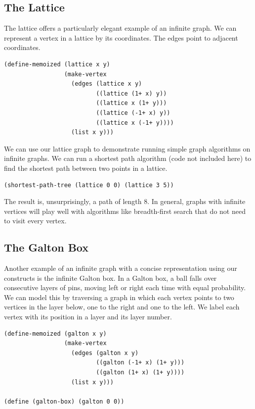 \documentclass[11pt]{article} %
\theoremstyle{component}
\begin{document}
\subsection{The Lattice}

The lattice offers a particularly elegant example of an infinite graph.  We can represent a vertex in a lattice by its coordinates.  The edges point to adjacent coordinates.

\begin{verbatim}
(define-memoized (lattice x y)
                 (make-vertex
                   (edges (lattice x y)
                          ((lattice (1+ x) y))
                          ((lattice x (1+ y)))
                          ((lattice (-1+ x) y))
                          ((lattice x (-1+ y))))
                   (list x y)))
\end{verbatim}

We can use our lattice graph to demonstrate running simple graph algorithms on infinite graphs.  We can run a shortest path algorithm (code not included here) to find the shortest path between two points in a lattice.

\begin{verbatim}
(shortest-path-tree (lattice 0 0) (lattice 3 5))
\end{verbatim}

\noindent The result is, unsurprisingly, a path of length 8.  In general, graphs with infinite vertices will play well with algorithms like breadth-first search that do not need to visit every vertex.

\subsection{The Galton Box}

Another example of an infinite graph with a concise representation using our constructs is the infinite Galton box.  In a Galton box, a ball falls over consecutive layers of pins, moving left or right each time with equal probability.  We can model this by traversing a graph in which each vertex points to two vertices in the layer below, one to the right and one to the left.  We label each vertex with its position in a layer and its layer number.

\begin{verbatim}
(define-memoized (galton x y)
                 (make-vertex
                   (edges (galton x y)
                          ((galton (-1+ x) (1+ y)))
                          ((galton (1+ x) (1+ y))))
                   (list x y)))
                   
(define (galton-box) (galton 0 0))
\end{verbatim}
\end{document}
